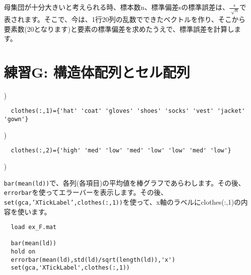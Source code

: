 \documentclass{jsarticle}
\begin{document}
\begin{screen}
母集団が十分大きいと考えられる時、標本数n、標準偏差sの標準誤差は、$\frac{s}{\sqrt[]{n}}$で表されます。そこで、今は、1行20列の乱数でできたベクトルを作り、そこから要素数(20となります)と要素の標準偏差を求めたうえで、標準誤差を計算します。
\end{screen}

\bigskip


\section{練習G: 構造体配列とセル配列}

)

\begin{verbatim}
  clothes(:,1)={'hat' 'coat' 'gloves' 'shoes' 'socks' 'vest' 'jacket' 'gown'}
\end{verbatim}

)

\begin{verbatim}
  clothes(:,2)={'high' 'med' 'low' 'med' 'low' 'low' 'med' 'low'}
\end{verbatim}


)

\begin{screen}
{\tt bar(mean(ld))}で、各列(各項目)の平均値を棒グラフであらわします。その後、{\tt errorbar}を使ってエラーバーを表示します。その後、{\tt set(gca,'XTickLabel',clothes(:,1))}を使って、x軸のラベルにclothes(:,1)の内容を使います。
\end{screen}

\begin{verbatim}
  load ex_F.mat

  bar(mean(ld))
  hold on
  errorbar(mean(ld),std(ld)/sqrt(length(ld)),'x')
  set(gca,'XTickLabel',clothes(:,1))
\end{verbatim}



\end{document}
